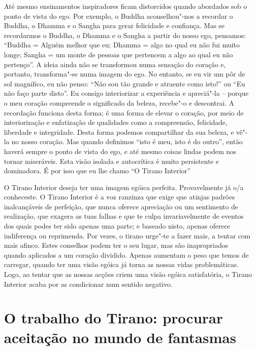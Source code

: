\sectionBreak

Até mesmo ensinamentos inspiradores ficam distorcidos quando abordados
sob o ponto de vista do ego. Por exemplo, o Buddha aconselhou"-nos a
recordar o Buddha, o Dhamma e o Sangha para gerar felicidade e
confiança. Mas se recordarmos o Buddha, o Dhamma e o Sangha a partir do
nosso ego, pensamos: “Buddha = Alguém melhor que eu; Dhamma = algo no
qual eu não fui muito longe; Sangha = um monte de pessoas que pertencem
a algo ao qual eu não pertenço”. A ideia ainda não se transformou numa
sensação do coração e, portanto, transforma"-se numa imagem do ego. No
entanto, se eu vir um pôr de sol magnífico, eu não penso: “Não sou tão
grande e atraente como isto!” ou “Eu não faço parte disto”. Eu consigo
interiorizar a experiência e apreciá"-la -- porque o meu coração
compreende o significado da beleza, recebe"-o e descontrai. A recordação
funciona desta forma; é uma forma de elevar o coração, por meio de
interiorização e enfatização de qualidades como a compreensão,
felicidade, liberdade e integridade. Desta forma podemos compartilhar da
sua beleza, e vê"-la no nosso coração. Mas quando definimos ``isto é meu,
isto é do outro”, então haverá sempre o ponto de vista do ego, e até
mesmo coisas lindas podem nos tornar miseráveis. Esta visão isolada e
autocrítica é muito persistente e dominadora. É por isso que eu lhe
chamo “O Tirano Interior”

O Tirano Interior deseja ter uma imagem egóica perfeita. Provavelmente
já o/a conheceste. O Tirano Interior é a voz ranzinza que exige que
atinjas padrões inalcançáveis de perfeição, que nunca oferece apreciação
ou um sentimento de realização, que exagera as tuas falhas e que te
culpa invariavelmente de eventos dos quais podes ter sido apenas uma
parte; e baseado nisto, apenas oferece indiferença ou reprimenda. Por
vezes, o tirano urge"-te a fazer mais, a tentar com mais afinco. Estes
conselhos podem ter o seu lugar, mas são inapropriados quando aplicados
a um coração dividido. Apenas aumentam o peso que temos de carregar,
quando ter uma visão egóica já torna as nossas vidas problemáticas.
Logo, ao tentar que as nossas acções criem uma visão egóica
satisfatória, o Tirano Interior acaba por as condicionar num sentido
negativo.

\section{O trabalho do Tirano: procurar aceitação no mundo de fantasmas}

